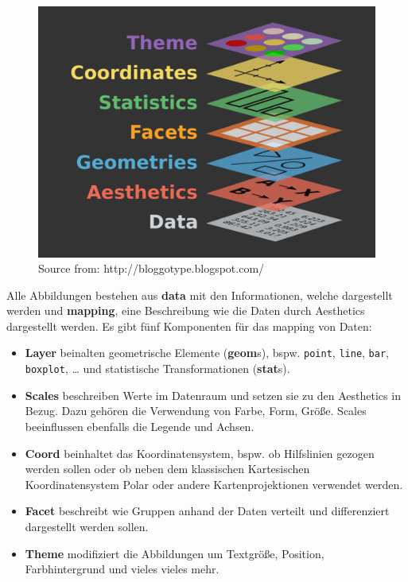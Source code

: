 \documentclass[
]{article}
\providecommand{\tightlist}{%
  \setlength{\itemsep}{0pt}\setlength{\parskip}{0pt}}
\begin{document}
\begin{figure}

{\centering \includegraphics[width=26.68in]{images/051} 

}

\caption{Source from: http://bloggotype.blogspot.com/}\label{fig:unnamed-chunk-166}
\end{figure}

Alle Abbildungen bestehen aus \textbf{data} mit den Informationen, welche dargestellt werden und \textbf{mapping}, eine Beschreibung wie die Daten durch Aesthetics dargestellt werden. Es gibt fünf Komponenten für das mapping von Daten:

\begin{itemize}
\tightlist
\item
  \textbf{Layer} beinalten geometrische Elemente (\textbf{geom}s), bspw. \texttt{point}, \texttt{line}, \texttt{bar}, \texttt{boxplot}, \ldots{} und statistische Transformationen (\textbf{stat}s).
\item
  \textbf{Scales} beschreiben Werte im Datenraum und setzen sie zu den Aesthetics in Bezug. Dazu gehören die Verwendung von Farbe, Form, Größe. Scales beeinflussen ebenfalls die Legende und Achsen.
\item
  \textbf{Coord} beinhaltet das Koordinatensystem, bspw. ob Hilfslinien gezogen werden sollen oder ob neben dem klassischen Kartesischen Koordinatensystem Polar oder andere Kartenprojektionen verwendet werden.
\item
  \textbf{Facet} beschreibt wie Gruppen anhand der Daten verteilt und differenziert dargestellt werden sollen.
\item
  \textbf{Theme} modifiziert die Abbildungen um Textgröße, Position, Farbhintergrund und vieles vieles mehr.
\end{itemize}
\end{document}
